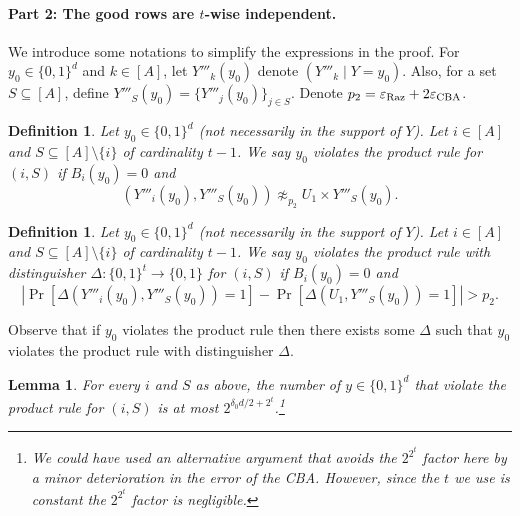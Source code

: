 \documentclass[10pt,a4paper]{article}
\newtheorem{definition}[theorem]{Definition}
\newtheorem{lemma}[theorem]{Lemma}
\begin{document}
\paragraph{Part 2: The good rows are $t$-wise independent.}
We introduce some notations to simplify the expressions in the proof. For $y_0\in\{0,1\}^d$ and $k\in[A]$, let $Y'''_k(y_0)$ denote $(Y'''_k\mid Y=y_0)$. Also, for a set $S\subseteq[A]$, define $Y'''_S(y_0)=\{Y'''_j(y_0)\}_{j\in S}$. Denote $p_2=\varepsilon_{\rm Raz}+2\varepsilon_{\rm CBA}$.
\begin{definition}
Let $y_0\in\{0,1\}^d$ (not necessarily in the support of $Y$). Let $i\in[A]$ and $S\subseteq[A]\setminus\{i\}$ of cardinality $t-1$. We say $y_0$ violates the product rule for $(i,S)$ if $B_i(y_0)=0$ and
\[(Y'''_i(y_0),Y'''_S(y_0))\not\approx_{p_2}U_1\times Y'''_S(y_0).\]
\end{definition}
\begin{definition}
Let $y_0\in\{0,1\}^d$ (not necessarily in the support of $Y$). Let $i\in[A]$ and $S\subseteq[A]\setminus\{i\}$ of cardinality $t-1$. We say $y_0$ violates the product rule with distinguisher $\Delta:\{0,1\}^t\to\{0,1\}$ for $(i,S)$ if $B_i(y_0)=0$ and
\[\left|\Pr[\Delta(Y'''_i(y_0),Y'''_S(y_0))=1]-\Pr[\Delta(U_1,Y'''_S(y_0))=1]\right|>p_2.\]
\end{definition}
Observe that if $y_0$ violates the product rule then there exists some $\Delta$ such that $y_0$ violates the product rule with distinguisher $\Delta$.
\begin{lemma}
For every $i$ and $S$ as above, the number of $y\in\{0,1\}^d$ that violate the product rule for $(i,S)$ is at most $2^{\delta_0d/2+2^t}$.\footnote{We could have used an alternative argument that avoids the $2^{2^t}$ factor here by a minor deterioration in the error of the CBA. However, since the $t$ we use is constant the $2^{2^t}$ factor is negligible.}
\end{lemma}
\end{document}
